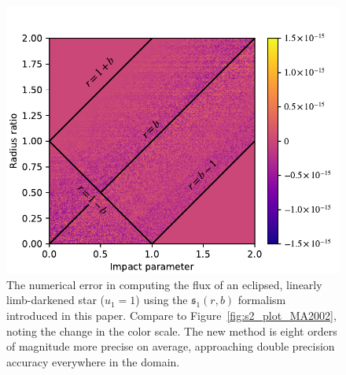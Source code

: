 \documentclass[modern,trackchanges]{aastex63}
\begin{document}
\begin{figure}[p!]
    \begin{centering}
    \includegraphics[width=0.8\linewidth]{figures/julia/s2_residuals.pdf}
    \caption{The numerical error in computing the flux of an eclipsed, linearly
    limb-darkened star ($u_1=1$) using the $\mathfrak{s}_1(r,b)$ formalism introduced in this
    paper. Compare to Figure~\ref{fig:s2_plot_MA2002}, noting the change in the color
    scale. The new method is eight orders of magnitude more precise on average,
    approaching double precision accuracy everywhere in the domain.
    \label{fig:s2_plot}}
    \end{centering}
\end{figure}


\pagebreak %
\end{document}
